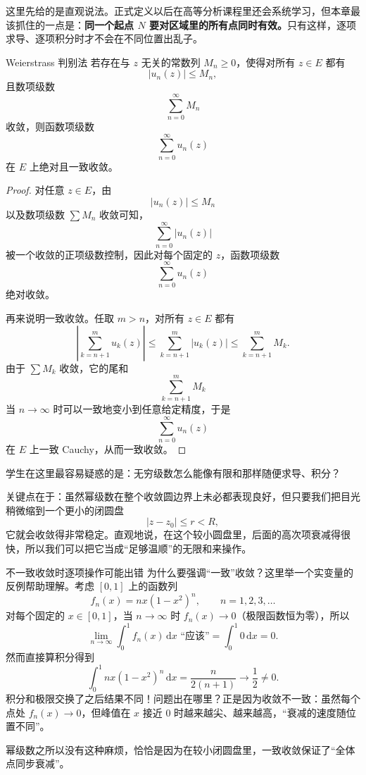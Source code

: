\begin{zhu}{}{}
这里先给的是直观说法。正式定义以后在高等分析课程里还会系统学习，但本章最该抓住的一点是：\textbf{同一个起点 $N$ 要对区域里的所有点同时有效。}只有这样，逐项求导、逐项积分时才不会在不同位置出乱子。
\end{zhu}

\begin{dingli}{Weierstrass 判别法}{}
若存在与 $z$ 无关的常数列 $M_n\ge 0$，使得对所有 $z\in E$ 都有
\[
    |u_n(z)|\le M_n,
\]
且数项级数
\[
    \sum_{n=0}^{\infty} M_n
\]
收敛，则函数项级数
\[
    \sum_{n=0}^{\infty} u_n(z)
\]
在 $E$ 上绝对且一致收敛。
\end{dingli}

\begin{proof}
对任意 $z\in E$，由
\[
    |u_n(z)|\le M_n
\]
以及数项级数 $\sum M_n$ 收敛可知，
\[
    \sum_{n=0}^{\infty} |u_n(z)|
\]
被一个收敛的正项级数控制，因此对每个固定的 $z$，函数项级数
\[
    \sum_{n=0}^{\infty} u_n(z)
\]
绝对收敛。

再来说明一致收敛。任取 $m>n$，对所有 $z\in E$ 都有
\[
    \left|\sum_{k=n+1}^{m}u_k(z)\right|
    \le \sum_{k=n+1}^{m}|u_k(z)|
    \le \sum_{k=n+1}^{m}M_k.
\]
由于 $\sum M_k$ 收敛，它的尾和
\[
    \sum_{k=n+1}^{m}M_k
\]
当 $n\to\infty$ 时可以一致地变小到任意给定精度，于是
\[
    \sum_{n=0}^{\infty} u_n(z)
\]
在 $E$ 上一致 Cauchy，从而一致收敛。
\end{proof}

\begin{tishi}[为什么这里要提一致收敛]
学生在这里最容易疑惑的是：无穷级数怎么能像有限和那样随便求导、积分？

关键点在于：虽然幂级数在整个收敛圆边界上未必都表现良好，但只要我们把目光稍微缩到一个更小的闭圆盘
\[
    |z-z_0|\le r<R,
\]
它就会收敛得非常稳定。直观地说，在这个较小圆盘里，后面的高次项衰减得很快，所以我们可以把它当成``足够温顺''的无限和来操作。
\end{tishi}

\begin{zhu}{不一致收敛时逐项操作可能出错}{}
为什么要强调``一致''收敛？这里举一个实变量的反例帮助理解。考虑 $[0,1]$ 上的函数列
\[
    f_n(x) = nx(1-x^2)^n, \qquad n=1,2,3,\ldots
\]
对每个固定的 $x\in[0,1]$，当 $n\to\infty$ 时 $f_n(x)\to 0$（极限函数恒为零），所以
\[
    \lim_{n\to\infty}\int_0^1 f_n(x)\,\mathrm{d}x \text{ ``应该''} = \int_0^1 0\,\mathrm{d}x = 0.
\]
然而直接算积分得到
\[
    \int_0^1 nx(1-x^2)^n\,\mathrm{d}x
    = \frac{n}{2(n+1)} \to \frac{1}{2} \ne 0.
\]
积分和极限交换了之后结果不同！问题出在哪里？正是因为收敛不一致：虽然每个点处 $f_n(x)\to 0$，但峰值在 $x$ 接近 $0$ 时越来越尖、越来越高，``衰减的速度随位置不同''。

幂级数之所以没有这种麻烦，恰恰是因为在较小闭圆盘里，一致收敛保证了``全体点同步衰减''。
\end{zhu}

